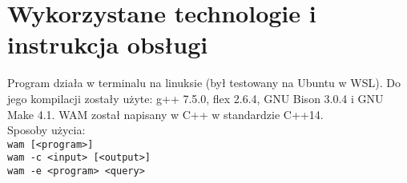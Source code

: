 \chapter{Wykorzystane technologie i instrukcja obsługi}
\thispagestyle{chapterBeginStyle}

\iffalse
W tym rozdziale należy przedstawić analizę zagadnienia, które podlega informatyzacji. Należy zidentyfikować i opisać obiekty składowe rozważanego wycinka rzeczywistości i ich wzajemne relacje (np.\ użytkowników systemu i ich role). Należy szczegółowo omówić procesy jakie zachodzą w systemie i które będą informatyzowane, takie jak np.\ przepływ dokumentów.
Należy sprecyzować i wypunktować założenia funkcjonalne i poza funkcjonalne dla projektowanego systemu.
Jeśli istnieją aplikacje realizujące dowolny podzbiór zadanych funkcjonalności realizowanego systemu należy przeprowadzić ich analizę porównawczą, wskazując na różnice bądź innowacyjne elementy, które projektowany w pracy system informatyczny będzie zawierał.
Należy odnieść się do uwarunkowań prawnych związanych z procesami przetwarzania danych w projektowanym systemie.
Jeśli zachodzi konieczność, należy wprowadzić i omówić model matematyczny elementów systemu na odpowiednim poziomie abstrakcji.

{\color{dgray}
W niniejszym rozdziale omówiono koncepcję architektury programowej systemu \ldots. W
szczególny sposób \ldots. Omówiono założenia funkcjonalne i niefunkcjonalne podsystemów \ldots. Przedstawiono
mechanizmy \ldots. Sklasyfikowano systemy ze względu na \ldots. Omówiono istniejące rozwiązania informatyczne o podobnej funkcjonalności \ldots (zobacz \cite{JCINodesChord}).
}
\fi

Program działa w terminalu na linuksie (był testowany na Ubuntu w WSL). Do jego kompilacji zostały użyte: g++ 7.5.0, flex 2.6.4, GNU Bison 3.0.4 i GNU Make 4.1. WAM został napisany w C++ w standardzie C++14.\\

Sposoby użycia:\\
\texttt{wam [<program>]}\\
\texttt{wam -c <input> [<output>]}\\
\texttt{wam -e <program> <query>}\\

